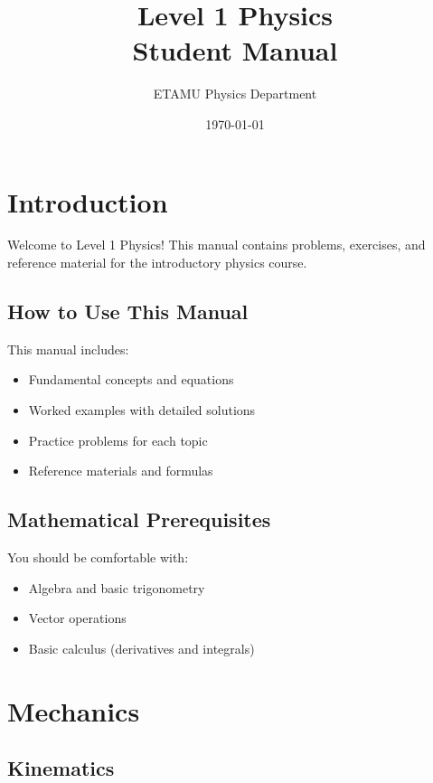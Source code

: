 \documentclass[11pt]{book}
\title{Level 1 Physics\\Student Manual}
\author{ETAMU Physics Department}
\date{\today}
\begin{document}
\frontmatter
\maketitle

\tableofcontents
\listoffigures

\chapter{Introduction}

Welcome to Level 1 Physics! This manual contains problems, exercises, and reference material for the introductory physics course. 

\section{How to Use This Manual}

This manual includes:
\begin{itemize}
    \item Fundamental concepts and equations
    \item Worked examples with detailed solutions
    \item Practice problems for each topic
    \item Reference materials and formulas
\end{itemize}

\section{Mathematical Prerequisites}

You should be comfortable with:
\begin{itemize}
    \item Algebra and basic trigonometry
    \item Vector operations
    \item Basic calculus (derivatives and integrals)
\end{itemize}

\mainmatter

\chapter{Mechanics}

\section{Kinematics}
\end{document}
